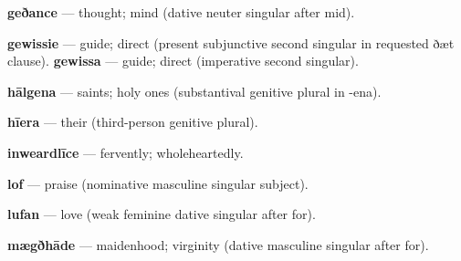 \textbf{geðance} — thought; mind (dative neuter singular after mid).

\textbf{gewissie} — guide; direct (present subjunctive second singular in requested ðæt clause). \textbf{gewissa} — guide; direct (imperative second singular).

\textbf{hālgena} — saints; holy ones (substantival genitive plural in -ena).

\textbf{hīera} — their (third-person genitive plural).

\textbf{inweardlīce} — fervently; wholeheartedly.

\textbf{lof} — praise (nominative masculine singular subject).

\textbf{lufan} — love (weak feminine dative singular after for).

\textbf{mægðhāde} — maidenhood; virginity (dative masculine singular after for).

